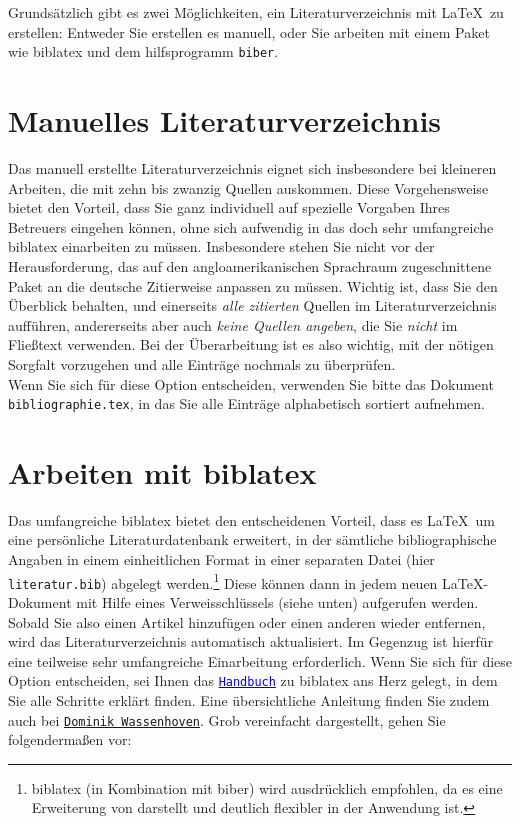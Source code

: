 \documentclass{scrbook}
\begin{document}
Grundsätzlich gibt es zwei Möglichkeiten, ein Literaturverzeichnis mit \LaTeX\ zu erstellen: Entweder Sie erstellen es manuell, oder Sie arbeiten mit einem Paket wie biblatex und dem hilfsprogramm \texttt{biber}.

\section{Manuelles Literaturverzeichnis}
Das manuell erstellte Literaturverzeichnis eignet sich insbesondere bei kleineren Arbeiten, die mit zehn bis zwanzig Quellen auskommen. Diese Vorgehensweise bietet den Vorteil, dass Sie ganz individuell auf spezielle Vorgaben Ihres Betreuers eingehen können, ohne sich aufwendig in das doch sehr umfangreiche biblatex einarbeiten zu müssen. Insbesondere stehen Sie nicht vor der Herausforderung, das auf den angloamerikanischen Sprachraum zugeschnittene Paket an die deutsche Zitierweise anpassen zu müssen. Wichtig ist, dass Sie den Überblick behalten, und einerseits \emph{alle zitierten}  Quellen im Literaturverzeichnis aufführen, andererseits aber auch \emph{keine Quellen angeben}, die Sie \emph{nicht} im Fließtext verwenden. Bei der Überarbeitung ist es also wichtig, mit der nötigen Sorgfalt vorzugehen und alle Einträge nochmals zu überprüfen.\\
Wenn Sie sich für diese Option entscheiden, verwenden Sie bitte das Dokument \texttt{bibliographie.tex}, in das Sie alle Einträge alphabetisch sortiert aufnehmen. 

\section{Arbeiten mit biblatex}
 
Das umfangreiche biblatex bietet den entscheidenen Vorteil, dass es \LaTeX\  um eine persönliche Literaturdatenbank erweitert, in der sämtliche bibliographische Angaben in einem einheitlichen Format in einer separaten Datei (hier \texttt{literatur.bib}) abgelegt werden.\footnote{biblatex (in Kombination mit biber) wird ausdrücklich empfohlen, da es eine Erweiterung von  darstellt und deutlich flexibler in der Anwendung ist.} Diese können dann in jedem neuen \LaTeX-Dokument mit Hilfe eines Verweisschlüssels (siehe unten) aufgerufen werden. Sobald Sie also einen Artikel hinzufügen oder einen anderen wieder entfernen, wird das Literaturverzeichnis automatisch aktualisiert. Im Gegenzug ist hierfür eine teilweise sehr umfangreiche Einarbeitung erforderlich. Wenn Sie sich für diese Option entscheiden, sei Ihnen das \href{https://texdoc.org/pkg/biblatex}{\textcolor{blue}{\texttt{Handbuch}}} zu biblatex ans Herz gelegt, in dem Sie alle Schritte erklärt finden. Eine übersichtliche Anleitung finden Sie zudem auch bei \href{http://www.nagel-net.de/Latex/DOKU/DTK-4_2008-biblatex-Teil2.pdf}{\color{blue}\texttt{Dominik Wassenhoven}}. Grob vereinfacht dargestellt, gehen Sie folgendermaßen vor:\\
\end{document}
